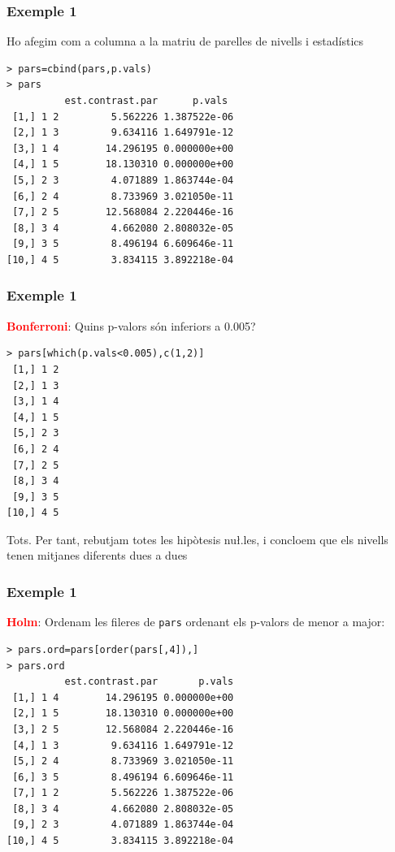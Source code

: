 \documentclass[12pt,t]{beamer}
\newcommand{\red}[1]{\textcolor{red}{#1}}
\theoremstyle{plain}
\theoremstyle{definition}
\begin{document}
\begin{frame}[fragile]
\frametitle{Exemple 1}
Ho afegim com a columna a la matriu de parelles de nivells i estadístics
\begin{verbatim}
> pars=cbind(pars,p.vals)
> pars
          est.contrast.par      p.vals
 [1,] 1 2         5.562226 1.387522e-06
 [2,] 1 3         9.634116 1.649791e-12
 [3,] 1 4        14.296195 0.000000e+00
 [4,] 1 5        18.130310 0.000000e+00
 [5,] 2 3         4.071889 1.863744e-04
 [6,] 2 4         8.733969 3.021050e-11
 [7,] 2 5        12.568084 2.220446e-16
 [8,] 3 4         4.662080 2.808032e-05
 [9,] 3 5         8.496194 6.609646e-11
[10,] 4 5         3.834115 3.892218e-04
\end{verbatim}

\end{frame}
\begin{frame}[fragile]
\frametitle{Exemple 1}
\red{\bf Bonferroni}: Quins p-valors són inferiors a 0.005?
{\small \begin{verbatim}
> pars[which(p.vals<0.005),c(1,2)]        
 [1,] 1 2
 [2,] 1 3
 [3,] 1 4
 [4,] 1 5
 [5,] 2 3
 [6,] 2 4
 [7,] 2 5
 [8,] 3 4
 [9,] 3 5
[10,] 4 5
\end{verbatim}
}

Tots. Per tant, rebutjam totes les hipòtesis nu\l.les, i concloem que els nivells tenen mitjanes diferents dues a dues

\end{frame}
\begin{frame}[fragile]
\frametitle{Exemple 1}

\red{\bf Holm}: Ordenam les fileres de \texttt{pars} ordenant els p-valors de menor a major:
{\small 
\begin{verbatim}
> pars.ord=pars[order(pars[,4]),]
> pars.ord
          est.contrast.par       p.vals
 [1,] 1 4        14.296195 0.000000e+00
 [2,] 1 5        18.130310 0.000000e+00
 [3,] 2 5        12.568084 2.220446e-16
 [4,] 1 3         9.634116 1.649791e-12
 [5,] 2 4         8.733969 3.021050e-11
 [6,] 3 5         8.496194 6.609646e-11
 [7,] 1 2         5.562226 1.387522e-06
 [8,] 3 4         4.662080 2.808032e-05
 [9,] 2 3         4.071889 1.863744e-04
[10,] 4 5         3.834115 3.892218e-04
\end{verbatim}
}
\end{frame}
\end{document}
